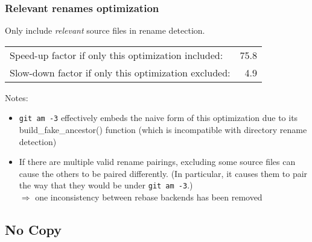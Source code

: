 \documentclass[compress,t]{beamer}
\begin{document}
\begin{frame}
  \frametitle{Relevant renames optimization}

  Only include \textit{relevant} source files in rename detection.

  \pause
  \vspace*{\baselineskip}
  \begin{tabular}{lr}
    Speed-up factor if only this optimization included:  & 75.8 \\
    Slow-down factor if only this optimization excluded: & 4.9
  \end{tabular}

  \vspace*{2\baselineskip}
  \pause
  Notes:
  \begin{itemize}
    \item \texttt{git am -3} effectively embeds the naive form of this
          optimization due to its build\_fake\_ancestor() function
          \pause
          (which is incompatible with directory rename detection)
          \pause
    \item If there are multiple valid rename pairings, excluding some source
          files can cause the others to be paired differently.  (In
          particular, it causes them to pair the way that they would be
          under \texttt{git am -3}.)\\
          \pause
          \vspace*{\baselineskip}
          $\Rightarrow$ one inconsistency between rebase backends has been
          removed
  \end{itemize}

\end{frame}

\subsection{No Copy}
\end{document}
